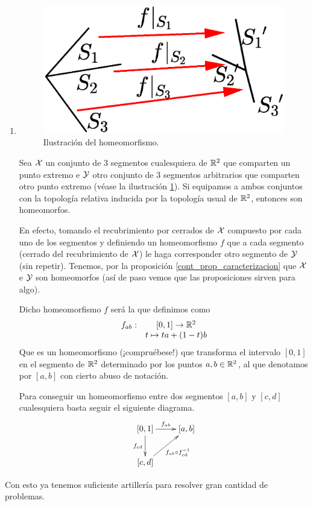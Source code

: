 \begin{exa}[Homeomorfismos]
\begin{enumerate}
		\item \begin{figure}[h!]
			\centering
			\includegraphics[scale = 0.3]{img/segmentos}
			\caption{Ilustración del homeomorfismo.}
			\label{cont_img_sementos}
		\end{figure}
		
		Sea $\mathcal{X}$ un conjunto de $3$ segmentos cualesquiera de $\mathbb{R}^2$ que comparten un punto extremo e $\mathcal{Y}$ otro conjunto de $3$ segmentos arbitrarios que comparten otro punto extremo (véase la ilustración \ref{cont_img_sementos}). Si equipamos a ambos conjuntos con la topología relativa inducida por la topología usual de $\mathbb{R}^2$, entonces son homeomorfos.
		
		En efecto, tomando el recubrimiento por cerrados de $\mathcal{X}$ compuesto por cada uno de los segmentos y definiendo un homeomorfismo $f$ que a cada segmento (cerrado del recubrimiento de $\mathcal{X}$) le haga corresponder otro segmento de $\mathcal{Y}$ (sin repetir). Tenemos, por la proposición \ref{cont_prop_caracterizacion} que $\mathcal{X}$ e $\mathcal{Y}$ son homeomorfos (así de paso vemos que las proposiciones sirven para algo).
		
		Dicho homeomorfismo $f$ será la  que definimos como
		\begin{equation}
		\label{interpolacion}
			\begin{array}{cc}
			f_{ab}:&[0,1]\to\mathbb{R}^2\\
			& t\mapsto ta+(1-t)b
			\end{array}
		\end{equation}
		Que es un homeomorfismo (¡compruébese!) que transforma el intervalo $[0,1]$ en el segmento de $\mathbb{R}^2$ determinado por los puntos $a,b\in\mathbb{R}^2$, al que denotamos por $[a,b]$ con cierto abuso de notación.
		
		Para conseguir un homeomorfismo entre dos segmentos $[a,b]$ y $[c,d]$ cualesquiera basta seguir el siguiente diagrama.
		\[\xymatrix{[0,1]\ar[r]^{f_{ab}}\ar[d]_{f_{cd}}&[a,b]\\
			[c,d]\ar[ru]_{f_{ab}\circ f^{-1}_{cd}}
			}\]
	\end{enumerate}
	Con esto ya tenemos suficiente artillería para resolver gran cantidad de problemas.
\end{exa}

